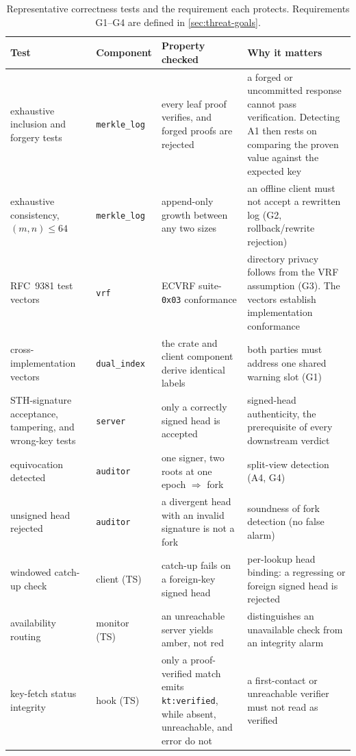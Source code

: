 \begin{table}[ht]
\centering
\caption[Representative correctness tests and the requirement each protects.]{Representative
correctness tests and the requirement each protects. Requirements G1--G4 are defined in
\cref{sec:threat-goals}.}
\label{tab:impl-t5a}
\footnotesize
\renewcommand{\arraystretch}{1.1}
\begin{tabularx}{\textwidth}{@{}Xp{1.9cm}XX@{}}
\toprule
Test & Component & Property checked & Why it matters \\
\midrule
exhaustive inclusion and forgery tests & \texttt{merkle\_log} & every leaf proof verifies, and forged proofs are rejected & a forged or uncommitted response cannot pass verification. Detecting A1 then rests on comparing the proven value against the expected key \\
exhaustive consistency, $(m,n)\le 64$ & \texttt{merkle\_log} & append-only growth between any two sizes & an offline client must not accept a rewritten log (G2, rollback/rewrite rejection) \\
RFC~9381 test vectors & \texttt{vrf} & ECVRF suite-\texttt{0x03} conformance & directory privacy follows from the VRF assumption (G3). The vectors establish implementation conformance \\
cross-implementation vectors & \texttt{dual\_index} & the crate and client component derive
identical labels & both parties must address one shared warning slot (G1) \\
STH-signature acceptance, tampering, and wrong-key tests & \texttt{server} & only a correctly signed head is accepted & signed-head authenticity, the prerequisite of every downstream verdict \\
equivocation detected & \texttt{auditor} & one signer, two roots at one epoch $\Rightarrow$ fork & split-view detection (A4, G4) \\
unsigned head rejected & \texttt{auditor} & a divergent head with an invalid signature is not a fork & soundness of fork detection (no false alarm) \\
windowed catch-up check & client (TS) & catch-up fails on a foreign-key signed head & per-lookup head binding: a regressing or foreign signed head is rejected \\
availability routing & monitor (TS) & an unreachable server yields amber, not red & distinguishes an unavailable check from an integrity alarm \\
key-fetch status integrity & hook (TS) & only a proof-verified match emits \texttt{kt:verified}, while absent, unreachable, and error do not & a first-contact or unreachable verifier must not read as verified \\
\bottomrule
\end{tabularx}
\end{table}

